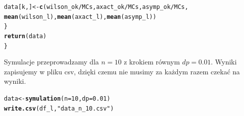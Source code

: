 \documentclass[12pt]{mwart}\usepackage[]{graphicx}\usepackage[]{color}
\makeatletter
\newcommand{\hlnum}[1]{\textcolor[rgb]{0.686,0.059,0.569}{#1}}%
\newcommand{\hlstr}[1]{\textcolor[rgb]{0.192,0.494,0.8}{#1}}%
\newcommand{\hlopt}[1]{\textcolor[rgb]{0,0,0}{#1}}%
\newcommand{\hlstd}[1]{\textcolor[rgb]{0.345,0.345,0.345}{#1}}%
\newcommand{\hlkwb}[1]{\textcolor[rgb]{0.69,0.353,0.396}{#1}}%
\newcommand{\hlkwc}[1]{\textcolor[rgb]{0.333,0.667,0.333}{#1}}%
\newcommand{\hlkwd}[1]{\textcolor[rgb]{0.737,0.353,0.396}{\textbf{#1}}}%
\newenvironment{kframe}{%
 \def\at@end@of@kframe{}%
 \ifinner\ifhmode%
  \def\at@end@of@kframe{\end{minipage}}%
  \begin{minipage}{\columnwidth}%
 \fi\fi%
 \def\FrameCommand##1{\hskip\@totalleftmargin \hskip-\fboxsep
 \colorbox{shadecolor}{##1}\hskip-\fboxsep
     \hskip-\linewidth \hskip-\@totalleftmargin \hskip\columnwidth}%
 \MakeFramed {\advance\hsize-\width
   \@totalleftmargin\z@ \linewidth\hsize
   \@setminipage}}%
 {\par\unskip\endMakeFramed%
 \at@end@of@kframe}
\newenvironment{knitrout}{}{} %
\makeatother
\begin{document}
\begin{knitrout}
\begin{kframe}
\begin{alltt}
    \hlstd{data[k,]}\hlkwb{<-} \hlkwd{c}\hlstd{( wilson_ok}\hlopt{/}\hlstd{MCs, axact_ok}\hlopt{/}\hlstd{MCs, asymp_ok}\hlopt{/}\hlstd{MCs,}
                  \hlkwd{mean}\hlstd{(wilson_l),} \hlkwd{mean}\hlstd{(axact_l),} \hlkwd{mean}\hlstd{(asymp_l))}
  \hlstd{\}}
  \hlkwd{return}\hlstd{(data)}
\hlstd{\}}
\end{alltt}
\end{kframe}
\end{knitrout}
Symulacje przeprowadzamy dla $n=10$ z krokiem równym $dp = 0.01$. Wyniki zapisujemy w pliku csv, dzięki czemu nie musimy za każdym razem czekać na wyniki.
\begin{knitrout}
\color{fgcolor}\begin{kframe}
\begin{alltt}
\hlstd{data} \hlkwb{<-} \hlkwd{symulation}\hlstd{(}\hlkwc{n} \hlstd{=} \hlnum{10}\hlstd{,} \hlkwc{dp} \hlstd{=} \hlnum{0.01}\hlstd{)}
\hlkwd{write.csv}\hlstd{(df_l,} \hlstr{"data_n_10.csv"}\hlstd{)}
\end{alltt}
\end{kframe}
\end{knitrout}
\end{document}
